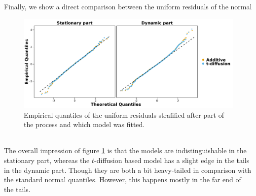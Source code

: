 Finally, we show a direct comparison between the uniform residuals of the normal
\begin{figure}[h!]
\begin{center}
    \includegraphics[scale = .1]{figures/OU_vs_t_diffusion_QQ_plot.jpeg}
    \caption{Empirical quantiles of the uniform residuals strafified after part of the process and which model was fitted.}
    \label{figure:OU_t_diffusion_QQ_plot}
\end{center}
\end{figure}\\
The overall impression of figure \ref{figure:OU_t_diffusion_QQ_plot} is that the models are indistinguishable in the stationary part, whereas the $t$-diffusion based model has a slight edge in the tails in the dynamic part. Though they are both a bit heavy-tailed in comparison with the standard normal quantiles. However, this happens mostly in the far end of the tails. 

